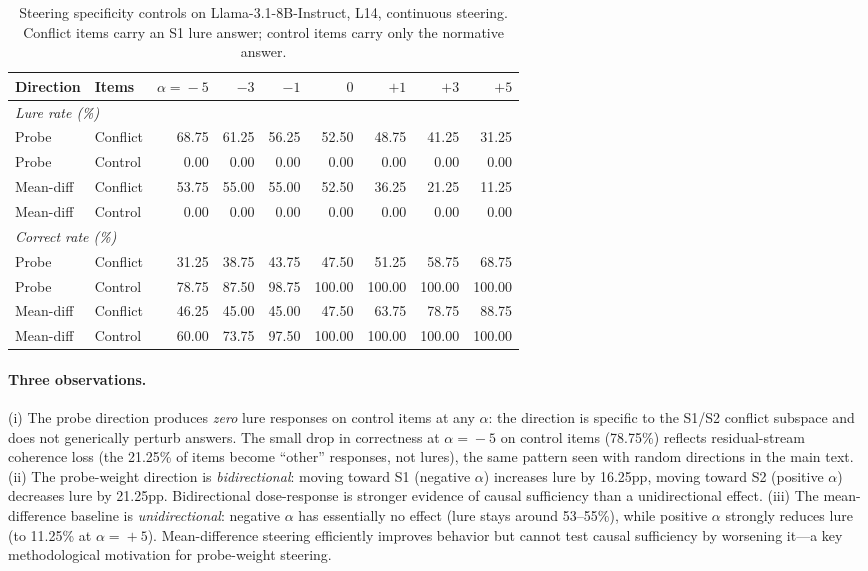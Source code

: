 \documentclass{article}
\begin{document}
\begin{table}[ht]
\centering
\caption{Steering specificity controls on Llama-3.1-8B-Instruct, L14,
  continuous steering.  Conflict items carry an S1 lure answer;
  control items carry only the normative answer.}
\label{tab:steering_specificity_anon}
\vspace{4pt}
\small
\begin{tabular}{l l rrrrrrr}
\toprule
\textbf{Direction} & \textbf{Items} & $\alpha\!=\!-5$ & $-3$ & $-1$ & $0$ & $+1$ & $+3$ & $+5$ \\
\midrule
\multicolumn{9}{l}{\emph{Lure rate (\%)}} \\
Probe        & Conflict & 68.75 & 61.25 & 56.25 & 52.50 & 48.75 & 41.25 & 31.25 \\
Probe        & Control  & 0.00  & 0.00  & 0.00  & 0.00  & 0.00  & 0.00  & 0.00  \\
Mean-diff    & Conflict & 53.75 & 55.00 & 55.00 & 52.50 & 36.25 & 21.25 & 11.25 \\
Mean-diff    & Control  & 0.00  & 0.00  & 0.00  & 0.00  & 0.00  & 0.00  & 0.00  \\
\midrule
\multicolumn{9}{l}{\emph{Correct rate (\%)}} \\
Probe        & Conflict & 31.25 & 38.75 & 43.75 & 47.50 & 51.25 & 58.75 & 68.75 \\
Probe        & Control  & 78.75 & 87.50 & 98.75 & 100.00 & 100.00 & 100.00 & 100.00 \\
Mean-diff    & Conflict & 46.25 & 45.00 & 45.00 & 47.50 & 63.75 & 78.75 & 88.75 \\
Mean-diff    & Control  & 60.00 & 73.75 & 97.50 & 100.00 & 100.00 & 100.00 & 100.00 \\
\bottomrule
\end{tabular}
\end{table}

\paragraph{Three observations.}
(i) The probe direction produces \emph{zero} lure responses on control
items at any $\alpha$: the direction is specific to the S1/S2 conflict
subspace and does not generically perturb answers.  The small drop in
correctness at $\alpha\!=\!-5$ on control items (78.75\%) reflects
residual-stream coherence loss (the 21.25\% of items become ``other''
responses, not lures), the same pattern seen with random directions
in the main text.  (ii) The probe-weight direction is \emph{bidirectional}:
moving toward S1 (negative $\alpha$) increases lure by 16.25pp,
moving toward S2 (positive $\alpha$) decreases lure by 21.25pp.
Bidirectional dose-response is stronger evidence of causal sufficiency
than a unidirectional effect.  (iii) The mean-difference baseline is
\emph{unidirectional}: negative $\alpha$ has essentially no effect
(lure stays around 53--55\%), while positive $\alpha$ strongly
reduces lure (to 11.25\% at $\alpha\!=\!+5$).  Mean-difference
steering efficiently improves behavior but cannot test causal
sufficiency by worsening it---a key methodological motivation for
probe-weight steering.


\end{document}
